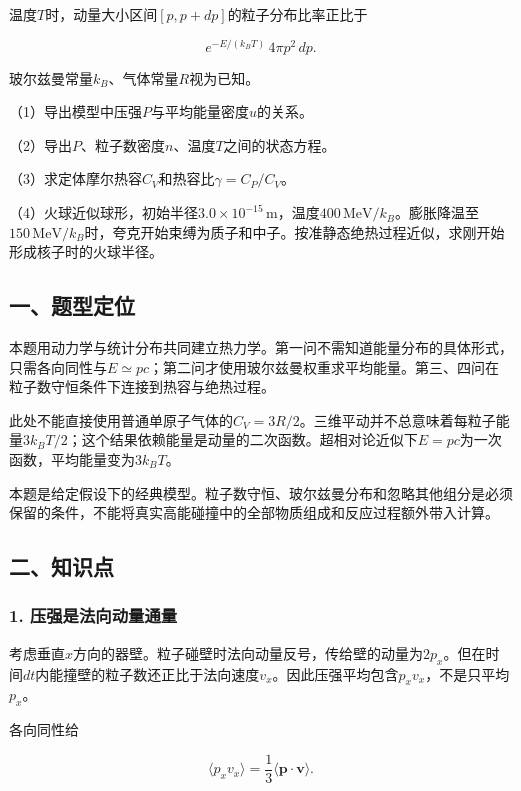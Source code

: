 \documentclass[12pt,a4paper,fontset=fandol]{ctexart}
\begin{document}
温度\(T\)时，动量大小区间\([p,p+dp]\)的粒子分布比率正比于

\[
e^{-E/(k_BT)}\,4\pi p^2\,dp.
\]

玻尔兹曼常量\(k_B\)、气体常量\(R\)视为已知。

（1）导出模型中压强\(P\)与平均能量密度\(u\)的关系。

（2）导出\(P\)、粒子数密度\(n\)、温度\(T\)之间的状态方程。

（3）求定体摩尔热容\(C_V\)和热容比\(\gamma=C_P/C_V\)。

（4）火球近似球形，初始半径\(3.0\times10^{-15}\,\mathrm m\)，温度\(400\,\mathrm{MeV}/k_B\)。膨胀降温至\(150\,\mathrm{MeV}/k_B\)时，夸克开始束缚为质子和中子。按准静态绝热过程近似，求刚开始形成核子时的火球半径。

\subsection{一、题型定位}\label{ux4e00ux9898ux578bux5b9aux4f4d-6}

本题用动力学与统计分布共同建立热力学。第一问不需知道能量分布的具体形式，只需各向同性与\(E\simeq pc\)；第二问才使用玻尔兹曼权重求平均能量。第三、四问在粒子数守恒条件下连接到热容与绝热过程。

此处不能直接使用普通单原子气体的\(C_V=3R/2\)。三维平动并不总意味着每粒子能量\(3k_BT/2\)；这个结果依赖能量是动量的二次函数。超相对论近似下\(E=pc\)为一次函数，平均能量变为\(3k_BT\)。

本题是给定假设下的经典模型。粒子数守恒、玻尔兹曼分布和忽略其他组分是必须保留的条件，不能将真实高能碰撞中的全部物质组成和反应过程额外带入计算。

\subsection{二、知识点}\label{ux4e8cux77e5ux8bc6ux70b9-6}

\subsubsection{1.
压强是法向动量通量}\label{ux538bux5f3aux662fux6cd5ux5411ux52a8ux91cfux901aux91cf}

考虑垂直\(x\)方向的器壁。粒子碰壁时法向动量反号，传给壁的动量为\(2p_x\)。但在时间\(dt\)内能撞壁的粒子数还正比于法向速度\(v_x\)。因此压强平均包含\(p_xv_x\)，不是只平均\(p_x\)。

各向同性给

\[
\langle p_xv_x\rangle
=\frac13\langle\boldsymbol p\cdot\boldsymbol v\rangle.
\]
\end{document}
